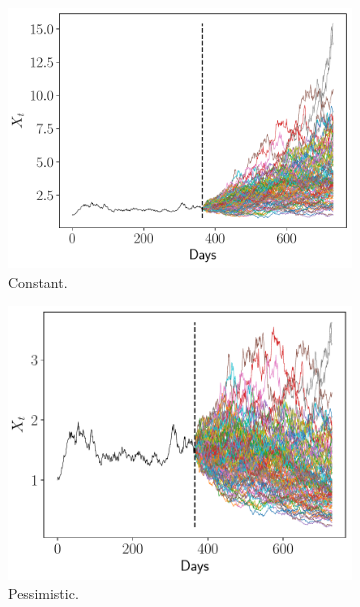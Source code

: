 \documentclass[11pt]{article}
\theoremstyle{definition}
\theoremstyle{remark}
\theoremstyle{remark}
\begin{document}
\begin{figure}[t]
  \centering
  \begin{subfigure}[b]{0.45\textwidth}
      \centering
      \includegraphics[scale=0.45]{pronostico-constante.pdf}
      \caption{Constant.}
  \end{subfigure}
  \begin{subfigure}[b]{0.45\textwidth}
      \centering
      \includegraphics[scale=0.45]{pronostico-pesimista.pdf}
      \caption{Pessimistic.}
  \end{subfigure}
  \begin{subfigure}[b]{0.45\textwidth}
      \centering

\end{subfigure}
\end{figure}
\end{document}
